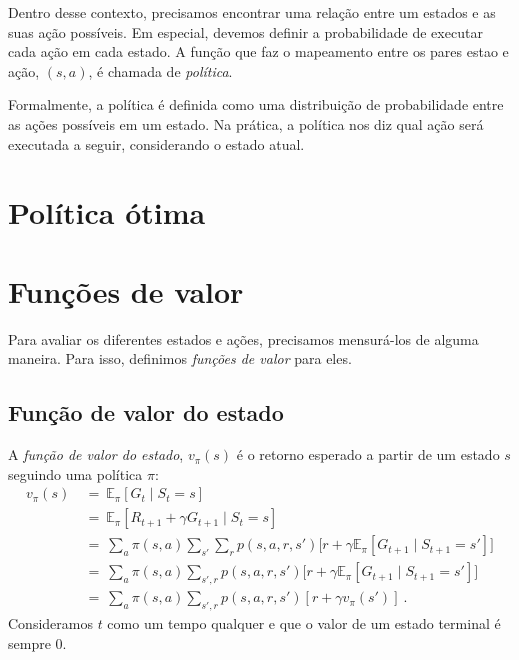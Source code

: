 \documentclass{article}
\begin{document}
        Dentro desse contexto, precisamos encontrar uma relação entre um estados e as suas ação possíveis. Em especial, devemos definir a probabilidade de executar cada ação em cada estado. A função que faz o mapeamento entre os pares estao e ação, $(s, a)$, é chamada de \emph{política}. 
        
        Formalmente, a política é definida como uma distribuição de probabilidade entre as ações possíveis em um estado. Na prática, a política nos diz qual ação será executada a seguir, considerando o estado atual.
    
        \section{Política ótima}
        
    
    \section{Funções de valor}
        
        Para avaliar os diferentes estados e ações, precisamos mensurá-los de alguma maneira. Para isso, definimos \emph{funções de valor} para eles.

        \subsection{Função de valor do estado}
        
            A \emph{função de valor do estado}, $v_{\pi}(s)$ é o retorno esperado a partir de um estado $s$ seguindo uma política $\pi$:
            \begin{equation}
            \label{eq:state-value}
            \begin{split}
                v_{\pi}(s) & \ = \ \mathbb{E}_{\pi}[G_t \mid S_t = s] \\
                & \ = \ \mathbb{E}_{\pi}[R_{t+1} + \gamma G_{t+1} \mid S_t = s] \\
                & \ = \ \sum_{a} \pi(s,a) \sum_{s'} \sum_{r} p(s, a, r, s') \Big[r + \gamma \mathbb{E}_{\pi}[ G_{t+1} \mid S_{t+1} = s'] \Big]\\
                & \ = \ \sum_{a} \pi(s,a) \sum_{s',r} p(s, a, r, s') \Big[r + \gamma \mathbb{E}_{\pi}[ G_{t+1} \mid S_{t+1} = s'] \Big]\\
                & \ = \ \sum_{a} \pi(s,a) \sum_{s', r} p(s, a, r, s') [r + \gamma v_{\pi}(s')]\ .
            \end{split}
            \end{equation}
            Consideramos $t$ como um tempo qualquer e que o valor de um estado terminal é sempre $0$.
\end{document}
